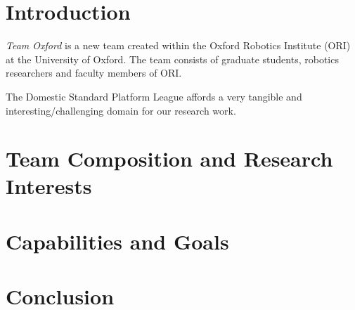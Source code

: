 \documentclass[runningheads,a4paper]{llncs}
\begin{document}
\section{Introduction}
\textit{Team Oxford} is a new team created within the Oxford Robotics Institute
(ORI) at the University of Oxford. The team consists of graduate students,
robotics researchers and faculty members of ORI.


The Domestic Standard Platform League affords a very tangible and 
interesting/challenging domain for our research work.

\section{Team Composition and Research Interests}

\section{Capabilities and Goals}

\section{Conclusion}



\end{document}
